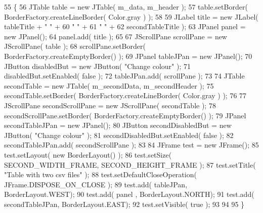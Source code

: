 \begin{DoxyCode}
55                                                                                              \{
56         JTable table = \textcolor{keyword}{new} JTable( m\_data, m\_header );
57         table.setBorder( BorderFactory.createLineBorder( Color.gray ) );
58             
59             JLabel title = \textcolor{keyword}{new} JLabel( tableTitle + \textcolor{stringliteral}{"      "} +
60                     \textcolor{stringliteral}{"                                      "} +
61                     \textcolor{stringliteral}{"                                      "} +
62                     secondTableTitle );
63             JPanel panel = \textcolor{keyword}{new} JPanel();
64             panel.add( title );
65             
67             JScrollPane scrollPane = \textcolor{keyword}{new} JScrollPane( table );
68             scrollPane.setBorder( BorderFactory.createEmptyBorder() );
69             JPanel tableJPan = \textcolor{keyword}{new} JPanel();
70             JButton disabledBut = \textcolor{keyword}{new} JButton( \textcolor{stringliteral}{"Change colour"} );
71             disabledBut.setEnabled( \textcolor{keyword}{false} );
72             tableJPan.add( scrollPane );
73            
74         JTable secondTable = \textcolor{keyword}{new} JTable( m\_secondData, m\_secondHeader );
75         secondTable.setBorder( BorderFactory.createLineBorder( Color.gray ) );
76             
77             JScrollPane secondScrollPane = \textcolor{keyword}{new} JScrollPane( secondTable );
78             secondScrollPane.setBorder( BorderFactory.createEmptyBorder() );
79             JPanel secondTableJPan = \textcolor{keyword}{new} JPanel();
80             JButton secondDisabledBut = \textcolor{keyword}{new} JButton( \textcolor{stringliteral}{"Change colour"} );
81             secondDisabledBut.setEnabled( \textcolor{keyword}{false} );
82             secondTableJPan.add( secondScrollPane );
83            
84         JFrame test = \textcolor{keyword}{new} JFrame();
85         test.setLayout( \textcolor{keyword}{new} BorderLayout() );
86         test.setSize( SECOND\_WIDTH\_FRAME, SECOND\_HEIGHT\_FRAME );
87         test.setTitle( \textcolor{stringliteral}{"Table with two csv files"} );
88         test.setDefaultCloseOperation( JFrame.DISPOSE\_ON\_CLOSE );
89         test.add( tableJPan, BorderLayout.WEST);
90         test.add( panel , BorderLayout.NORTH);
91         test.add( secondTableJPan, BorderLayout.EAST);        
92         test.setVisible( \textcolor{keyword}{true} );
93             
94        
95     \}
\end{DoxyCode}


